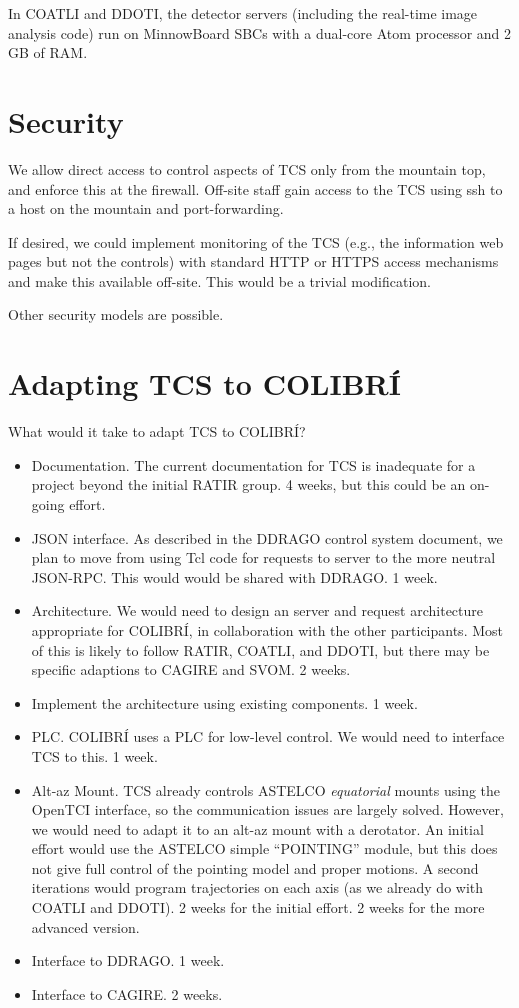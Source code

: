 \documentclass{article}
\begin{document}
In COATLI and DDOTI, the detector servers (including the real-time image analysis code) run on MinnowBoard SBCs with a dual-core Atom processor and 2 GB of RAM.

\section{Security}

We allow direct access to control aspects of TCS only from the mountain top, and enforce this at the firewall. Off-site staff gain access to the TCS using ssh to a host on the mountain and port-forwarding.

If desired, we could implement monitoring of the TCS (e.g., the information web pages but not the controls) with standard HTTP or HTTPS access mechanisms and make this available off-site. This would be a trivial modification.

Other security models are possible.

\section{Adapting TCS to COLIBRÍ}

What would it take to adapt TCS to COLIBRÍ?

\begin{itemize}
\item
Documentation. The current documentation for TCS is inadequate for a project beyond the initial RATIR group. 4 weeks, but this could be an on-going effort.
\item
JSON interface. As described in the DDRAGO control system document, we plan to move from using Tcl code for requests to server to the more neutral JSON-RPC. This would would be shared with DDRAGO. 1 week.
\item
Architecture. We would need to design an server and request architecture appropriate for COLIBRÍ, in collaboration with the other participants. Most of this is likely to follow RATIR, COATLI, and DDOTI, but there may be specific adaptions to CAGIRE and SVOM. 2 weeks.
\item
Implement the architecture using existing components. 1 week.
\item
PLC. COLIBRÍ uses a PLC for low-level control. We would need to interface TCS to this. 1 week.
\item
Alt-az Mount. TCS already controls ASTELCO \emph{equatorial} mounts using the OpenTCI interface, so the communication issues are largely solved. However, we would need to adapt it to an alt-az mount with a derotator. An initial effort would use the ASTELCO simple “POINTING” module, but this does not give full control of the pointing model and proper motions. A second iterations would program trajectories on each axis (as we already do with COATLI and DDOTI). 2 weeks for the initial effort. 2 weeks for the more advanced version.
\item
Interface to DDRAGO. 1 week.
\item
Interface to CAGIRE. 2 weeks.
\end{itemize}
\end{document}
